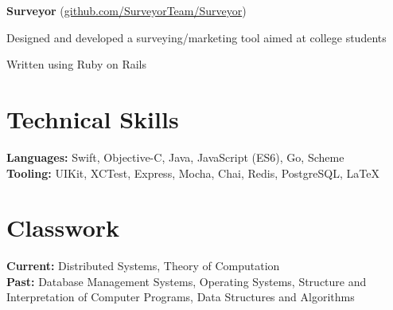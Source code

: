 \documentclass[11pt, a4paper]{article}
\newcommand{\note}[1]{\marginnote{\scriptsize #1}}
\renewenvironment{itemize}[1]{\begin{compactitem}#1}{\end{compactitem}}
\begin{document}
\note{Spring 2015}
\textbf{Surveyor} (\href{https://github.com/surveyorteam/surveyor}{github.com/SurveyorTeam/Surveyor})
\begin{itemize}
    \item Designed and developed a surveying/marketing tool aimed at college students
    \item Written using Ruby on Rails

\end{itemize}

\section*{Technical Skills}
\textbf{Languages:} Swift, Objective-C, Java, JavaScript (ES6), Go, Scheme\\
\textbf{Tooling:} UIKit, XCTest, Express, Mocha, Chai, Redis, PostgreSQL, \LaTeX

\section*{Classwork}
\textbf{Current:} Distributed Systems, Theory of Computation\\
\textbf{Past:} Database Management Systems, Operating Systems, Structure and Interpretation of Computer Programs, Data Structures and Algorithms
\end{document}
